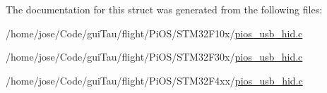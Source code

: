 The documentation for this struct was generated from the following files\-:\begin{DoxyCompactItemize}
\item 
/home/jose/\-Code/gui\-Tau/flight/\-Pi\-O\-S/\-S\-T\-M32\-F10x/\hyperlink{_s_t_m32_f10x_2pios__usb__hid_8c}{pios\-\_\-usb\-\_\-hid.\-c}\item 
/home/jose/\-Code/gui\-Tau/flight/\-Pi\-O\-S/\-S\-T\-M32\-F30x/\hyperlink{_s_t_m32_f30x_2pios__usb__hid_8c}{pios\-\_\-usb\-\_\-hid.\-c}\item 
/home/jose/\-Code/gui\-Tau/flight/\-Pi\-O\-S/\-S\-T\-M32\-F4xx/\hyperlink{_s_t_m32_f4xx_2pios__usb__hid_8c}{pios\-\_\-usb\-\_\-hid.\-c}\end{DoxyCompactItemize}
